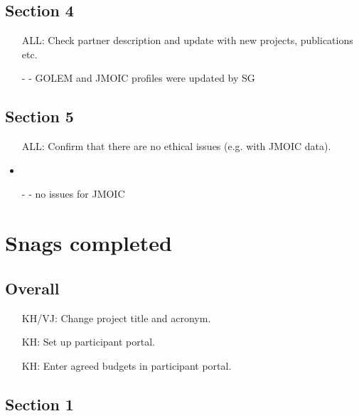 \subsection*{Section 4}
\begin{itemize}
\item[ALL:]
Check partner description and update with new projects, publications etc.
\item[-] - GOLEM and JMOIC profiles were updated by SG
\end{itemize}

\subsection*{Section 5}

\begin{itemize}
\item[ALL:]
Confirm that there are no ethical issues (e.g. with JMOIC data).
\item \item[-] - no issues for JMOIC
\end{itemize}

\newpage
\section*{Snags completed}

\subsection*{Overall}

\begin{itemize}
\item[KH/VJ:]
Change project title and acronym.
\item[KH:]
Set up participant portal.  
\item[KH:]
Enter agreed budgets in participant portal.
\end{itemize}

\subsection*{Section 1}

